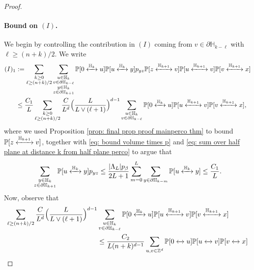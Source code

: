 \documentclass[11pt,a4paper]{article}
\numberwithin{equation}{section}
\theoremstyle{plain}
\theoremstyle{definition}
\newcommand{\connect}{\xleftrightarrow}
\begin{document}
\begin{proof}
\paragraph{Bound on $(I)$.} We begin by controlling the contribution in $(I)$ coming from $v\in \partial\mathbb H_{k-\ell}$ with $\ell\geq (n+k)/2$. We write
\begin{align}
	(I)_1&:=\sum_{\substack{k\ge0\\ \ell\geq (n+k)/2}}\sum_{\substack{u\in \mathbb H_{k}\\v\in \partial\mathbb H_{k-\ell}\\y\in \mathbb H_k\\z\in \partial\mathbb H_{k+1}}}\mathbb P[0\connect{\mathbb H_k\:}u]\mathbb P[u\connect{\mathbb H_k\:}y]p_{yz}\mathbb P[z\connect{\mathbb H_{k+1}\:}v]\mathbb P[u\connect{\mathbb H_{k+1}\:}v]\mathbb P[v\connect{\mathbb H_{k+1}\:}x]\notag
	\\&\leq \frac{C_1}{L}\sum_{\substack{k\ge0\\ \ell\geq (n+k)/2}}\frac{C}{L^d}\Big(\frac{L}{L\vee (\ell+1)}\Big)^{d-1}\sum_{\substack{u\in \mathbb H_k\\v\in \partial\mathbb H_{k-\ell}}}\mathbb P[0\connect{\mathbb H_k\:}u]\mathbb P[u\connect{\mathbb H_{k+1}\:}v]\mathbb P[v\connect{\mathbb H_{k+1}\:}x],\label{eq:bound error lower bound full plane perco 1}
\end{align}
where we used Proposition \ref{prop: final prop proof mainperco thm} to bound $\mathbb P[z\connect{\mathbb H_{k+1}\:}v]$, together with \eqref{eq: bound volume times p} and \eqref{eq: sum over half plane at distance k from half plane perco} to argue that
\begin{equation}\label{eq:bound error lower bound full plane perco 1.5}
	\sum_{\substack{y\in \mathbb H_k\\z\in \partial\mathbb H_{k+1}}}\mathbb P [u\connect{\mathbb H_k\:}y]p_{yz}\leq \frac{|\Lambda_L|p_\beta}{2L+1}\sum_{m=0}^L\sum_{y\in \partial\mathbb H_{k-m}}\mathbb P[u\connect{\mathbb H_k\:}y]\leq \frac{C_1}{L}.
\end{equation}
Now, observe that
\begin{align}\notag
	\sum_{\ell\geq (n+k)/2}\frac{C}{L^d}\Big(\frac{L}{L\vee (\ell+1)}\Big)^{d-1}&\sum_{\substack{u\in \mathbb H_k\\v\in \partial\mathbb H_{k-\ell}}}\mathbb P[0\connect{\mathbb H_k\:}u]\mathbb P[u\connect{\mathbb H_{k+1}\:}v]\mathbb P[v\connect{\mathbb H_{k+1}\:}x]
	\\&\leq \frac{C_2}{L(n+k)^{d-1}}\sum_{u,v\in \mathbb Z^d}\mathbb P[0\connect{}u]\mathbb P[u\connect{}v]\mathbb P[v\connect{}x]\notag

\end{align}
\end{proof}
\end{document}

